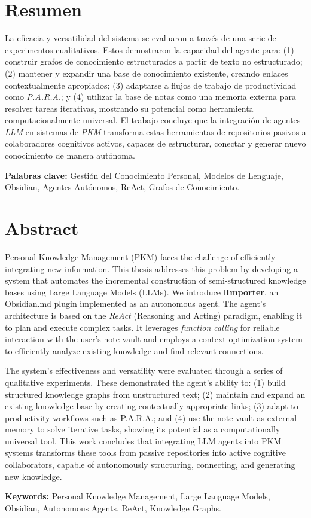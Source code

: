 \chapter*{Resumen}


La eficacia y versatilidad del sistema se evaluaron a través de una serie de experimentos cualitativos. Estos demostraron la capacidad del agente para: (1) construir grafos de conocimiento estructurados a partir de texto no estructurado; (2) mantener y expandir una base de conocimiento existente, creando enlaces contextualmente apropiados; (3) adaptarse a flujos de trabajo de productividad como \textit{P.A.R.A}.; y (4) utilizar la base de notas como una memoria externa para resolver tareas iterativas, mostrando su potencial como herramienta computacionalmente universal. El trabajo concluye que la integración de agentes \textit{LLM} en sistemas de \textit{PKM} transforma estas herramientas de repositorios pasivos a colaboradores cognitivos activos, capaces de estructurar, conectar y generar nuevo conocimiento de manera autónoma.

\vspace{1cm}
\textbf{Palabras clave:} Gestión del Conocimiento Personal, Modelos de Lenguaje, Obsidian, Agentes Autónomos, ReAct, Grafos de Conocimiento.

\chapter*{Abstract}

Personal Knowledge Management (PKM) faces the challenge of efficiently integrating new information. This thesis addresses this problem by developing a system that automates the incremental construction of semi-structured knowledge bases using Large Language Models (LLMs). We introduce \textbf{lImporter}, an Obsidian.md plugin implemented as an autonomous agent. The agent's architecture is based on the \textit{ReAct} (Reasoning and Acting) paradigm, enabling it to plan and execute complex tasks. It leverages \textit{function calling} for reliable interaction with the user's note vault and employs a context optimization system to efficiently analyze existing knowledge and find relevant connections.

The system's effectiveness and versatility were evaluated through a series of qualitative experiments. These demonstrated the agent's ability to: (1) build structured knowledge graphs from unstructured text; (2) maintain and expand an existing knowledge base by creating contextually appropriate links; (3) adapt to productivity workflows such as P.A.R.A.; and (4) use the note vault as external memory to solve iterative tasks, showing its potential as a computationally universal tool. This work concludes that integrating LLM agents into PKM systems transforms these tools from passive repositories into active cognitive collaborators, capable of autonomously structuring, connecting, and generating new knowledge.

\vspace{1cm}
\textbf{Keywords:} Personal Knowledge Management, Large Language Models, Obsidian, Autonomous Agents, ReAct, Knowledge Graphs.